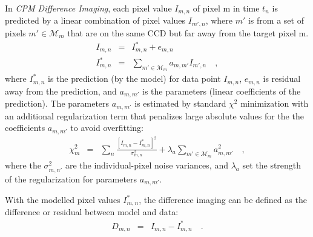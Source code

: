 \documentclass[12pt, preprint]{aastex}
\newcommand{\project}[1]{\textsl{#1}}
\newcommand{\cpmdiff}{\project{CPM Difference Imaging}}
\newcommand{\set}[1]{\mathcal{#1}}
\begin{document}
In \cpmdiff, each pixel value $I_{m,n}$ of pixel m in time $t_n$ is predicted by a linear combination of pixel values $I_{m',n}$, where $m'$ is from a set of pixels $m'\in\set{M}_m$ that are on the same CCD but far away from the target pixel m.
\begin{eqnarray}
I_{m,n}         &=& I^{\ast}_{m,n} + e_{m,n}
\\
I^{\ast}_{m,n}  &=& \sum_{m'\in\set{M}_m} a_{m,m'}I_{m',n} 
\quad,
\end{eqnarray}
where $I^{\ast}_{m,n}$ is the prediction (by the model) for data point $I_{m,n}$, $e_{m,n}$ is residual away from the prediction, and $a_{m,m'}$ is the parameters (linear coefficients of the prediction).
The parameters $a_{m,m'}$ is estimated by standard $\chi^2$ minimization with an additional regularization term that penalizes large absolute values for the the coefficients $a_{m,m'}$ to avoid overfitting:
\begin{eqnarray}
\chi^2_{m}    &=& \sum_{n} \frac{[I_{m,n} - I^{\ast}_{m,n}]^2}{\sigma^2_{m,n}}+ \lambda_{a}\sum_{m'\in\set{M}_m}a_{m,m'}^2 
\quad,
\end{eqnarray}
where the $\sigma^2_{m,n'}$ are the individual-pixel noise variances, and $\lambda_{a}$ set the strength of the regularization for parameters $a_{m,m'}$.

With the modelled pixel values $I^{\ast}_{m,n}$, the difference imaging can be defined as the difference or residual between model and data:
\begin{eqnarray}
D_{m,n} &=& I_{m,n} - I^{\ast}_{m,n}
\quad.
\end{eqnarray}


\clearpage

\clearpage
\end{document}
